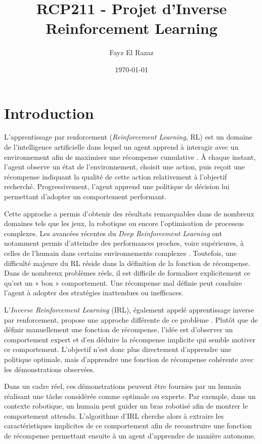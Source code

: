 \documentclass{article}
\title{RCP211 - Projet d'Inverse Reinforcement Learning}
\author{Fayz El Razaz}
\date{\today}
\begin{document}
\maketitle


\section{Introduction}

L’apprentissage par renforcement (\textit{Reinforcement Learning}, RL) est un domaine de l’intelligence artificielle dans lequel un agent apprend à interagir avec un environnement afin de maximiser une récompense cumulative \cite{sutton2018reinforcement}. À chaque instant, l’agent observe un état de l’environnement, choisit une action, puis reçoit une récompense indiquant la qualité de cette action relativement à l’objectif recherché. Progressivement, l’agent apprend une politique de décision lui permettant d’adopter un comportement performant.

Cette approche a permis d’obtenir des résultats remarquables dans de nombreux domaines tels que les jeux, la robotique ou encore l’optimisation de processus complexes. Les avancées récentes du \textit{Deep Reinforcement Learning} ont notamment permis d’atteindre des performances proches, voire supérieures, à celles de l’humain dans certains environnements complexes \cite{mnih2015human, silver2016mastering}. Toutefois, une difficulté majeure du RL réside dans la définition de la fonction de récompense. Dans de nombreux problèmes réels, il est difficile de formaliser explicitement ce qu’est un « bon » comportement. Une récompense mal définie peut conduire l’agent à adopter des stratégies inattendues ou inefficaces.

L’\textit{Inverse Reinforcement Learning} (IRL), également appelé apprentissage inverse par renforcement, propose une approche différente de ce problème \cite{ng2000algorithms, abbeel2004apprenticeship}. Plutôt que de définir manuellement une fonction de récompense, l’idée est d’observer un comportement expert et d’en déduire la récompense implicite qui semble motiver ce comportement. L’objectif n’est donc plus directement d’apprendre une politique optimale, mais d’apprendre une fonction de récompense cohérente avec les démonstrations observées.

Dans un cadre réel, ces démonstrations peuvent être fournies par un humain réalisant une tâche considérée comme optimale ou experte. Par exemple, dans un contexte robotique, un humain peut guider un bras robotisé afin de montrer le comportement attendu. L’algorithme d’IRL cherche alors à extraire les caractéristiques implicites de ce comportement afin de reconstruire une fonction de récompense permettant ensuite à un agent d’apprendre de manière autonome.
\end{document}
